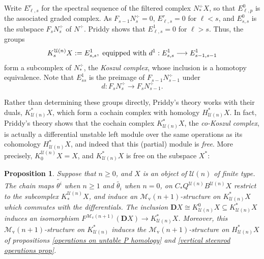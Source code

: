 \documentclass[11pt]{amsart} \renewcommand{\baselinestretch}{1.2}
\theoremstyle{plain}
\newtheorem{prop}[thm]{Proposition}
\numberwithin{equation}{section} %
\theoremstyle{plain}
\newtheorem{prop}[thm]{Proposition}
\numberwithin{equation}{chapter} %
\renewcommand{\to}{\longrightarrow}
\newcommand{\calU}{\mathcal{U}}
\newcommand{\calMv}{\mathcal{M}\dver}
\newcommand{\Nop}{N^{\smash{-}}}
\newcommand{\dver}{_\mathrm{v}}
\newcommand{\dual}{\mathbf{D}}
\begin{document}
\begin{Koszul complexes}
Write $E^r_{\ell,s}$ for the spectral sequence of the filtered complex $N^\div_*X$, so that $E^0_{\ell,p}$ is the associated graded complex. As $F_{s-1} N^\div_s=0$, $E^r_{\ell,s}=0$ for $\ell<s$, and $E^0_{s,s}$ is the subspace $F_sN^\div_s$ of $N^\div$. %
Priddy \cite[Proof of Theorem 5.3]{PriddyKoszul.pdf} shows that $E^1_{\ell,s}=0$  for $\ell>s$. Thus, the groups
\[K_s^{\calU(n)}X:=E^1_{s,s}, \textup{ equipped with $d^1:E^1_{s,s}\to E^1_{s-1,s-1}$}\]
form a subcomplex of $N^\div_*$, the \emph{Koszul complex}, whose inclusion is a homotopy equivalence. Note that $E^1_{ss}$ is the preimage of $F_{s-1}N^\div_{s-1}$ under
\[d:F_{s}N^\div_{s}\to F_{s}N^\div_{s-1}.\]


Rather than determining these groups directly, Priddy's theory works with their duals, $K^*_{\calU(n)}X$, which form a cochain complex with homology $H^*_{\calU(n)}X$. In fact, Priddy's theory shows that the cochain complex $K^*_{\calU(n)}X$, the \emph{co-Koszul complex}, is actually a differential unstable left module over the same operations as its cohomology $H^*_{\calU(n)}X$, and indeed that this (partial) module is \emph{free}. More precisely,  $K_0^{\calU(n)}X= X$, and $K^*_{\calU(n)}X$ is free on the  subspace $X^*$:
\begin{prop}
\label{the cokoszul complex is free}
Suppose that $n\geq0$, and $X$ is an object of $\calU(n)$ of finite type. The chain maps $\widetilde{\theta^i}$ when $n\geq1$ and $\widetilde{\theta_i}$ when $n=0$, on $C_*Q^{\calU(n)}B^{\calU(n)}X$ restrict to the subcomplex $K_*^{\calU(n)}X$, and induce an $\calMv(n+1)$-structure on $K^*_{\calU(n)}X$ which commutes with the differentials. The inclusion $\dual X\cong K^0_{\calU(n)}X\subseteq K^*_{\calU(n)}X$ induces an isomorphism $F^{\calMv(n+1)}(\dual X)\to K^*_{\calU(n)}X$. Moreover, this $\calMv(n+1)$-structure on $K^*_{\calU(n)}$ induces the $\calMv(n+1)$-structure on $H^*_{\calU(n)}X$ of propositions \ref{operations on untable P homology} and \ref{vertical steenrod operations prop}.
\end{prop}



\end{Koszul complexes}
\end{document}
